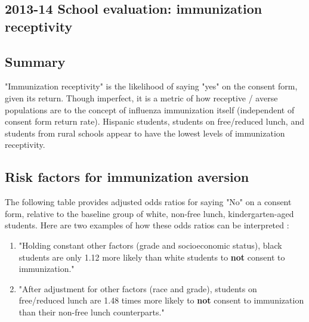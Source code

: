 \documentclass{article}
\begin{document}
\begin{center}
\section*{2013-14 School evaluation: immunization receptivity}
\end{center}
\begin{multicols}{2}


\subsection*{Summary}

"Immunization receptivity" is the likelihood of saying "yes" on the consent form, given its return.  Though imperfect, it is a metric of how receptive / averse populations are to the concept of influenza immunization itself (independent of consent form return rate).  Hispanic students, students on free/reduced lunch, and students from rural schools appear to have the lowest levels of immunization receptivity.

\subsection*{Risk factors for immunization aversion}


The following table provides adjusted odds ratios for saying "No" on a consent form, relative to the baseline group of white, non-free lunch, kindergarten-aged students. Here are two examples of how these odds ratios can be interpreted :\begin{enumerate}
\item "Holding constant other factors (grade and socioeconomic status), black students are only 1.12 more likely than white students to \textbf{not} consent to immunization."
\item "After adjustment for other factors (race and grade), students on free/reduced lunch are 1.48 times more likely to \textbf{not} consent to immunization than their non-free lunch counterparts."
\end{enumerate}





\end{multicols}
\end{document}
